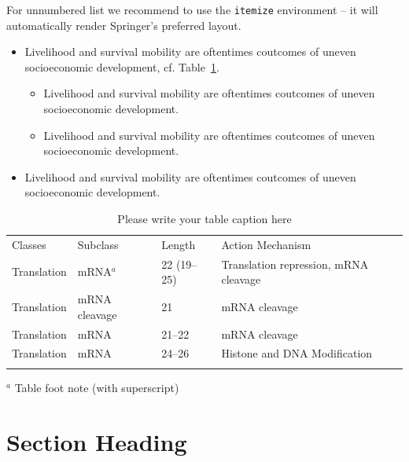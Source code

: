 \documentclass[graybox, envcountchap]{svmult}
\begin{document}
For unnumbered list we recommend to use the \verb|itemize| environment -- it will automatically render Springer's preferred layout.

\begin{itemize}
\item{Livelihood and survival mobility are oftentimes coutcomes of uneven socioeconomic development, cf. Table~\ref{tab:1}.}
\begin{itemize}
\item{Livelihood and survival mobility are oftentimes coutcomes of uneven socioeconomic development.}
\item{Livelihood and survival mobility are oftentimes coutcomes of uneven socioeconomic development.}
\end{itemize}
\item{Livelihood and survival mobility are oftentimes coutcomes of uneven socioeconomic development.}
\end{itemize}



\begin{table}
\caption{Please write your table caption here}
\label{tab:1}       %
\begin{tabular}{p{2cm}p{2.4cm}p{2cm}p{4.9cm}}
\hline\noalign{\smallskip}
Classes & Subclass & Length & Action Mechanism  \\
\noalign{\smallskip}\svhline\noalign{\smallskip}
Translation & mRNA$^a$  & 22 (19--25) & Translation repression, mRNA cleavage\\
Translation & mRNA cleavage & 21 & mRNA cleavage\\
Translation & mRNA  & 21--22 & mRNA cleavage\\
Translation & mRNA  & 24--26 & Histone and DNA Modification\\
\noalign{\smallskip}\hline\noalign{\smallskip}
\end{tabular}
$^a$ Table foot note (with superscript)
\end{table}










\section{Section Heading}
\label{sec:3}
\end{document}
